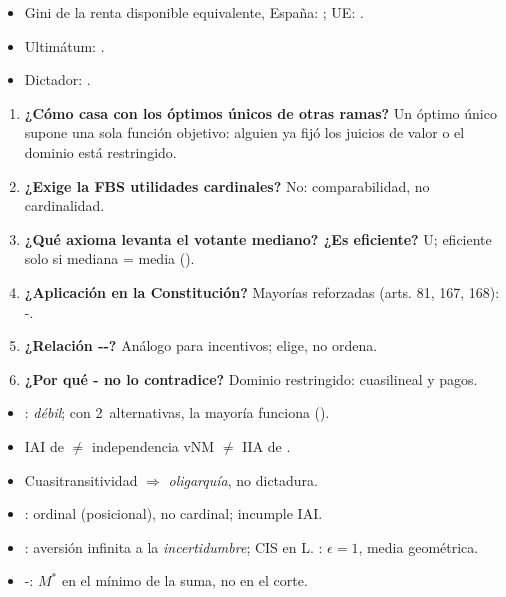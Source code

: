 \documentclass{article}
\begin{document}
\begin{columnas}
\anexorepaso
{}
\begin{itemize}
\item Gini de la renta disponible equivalente, España: ; UE: .
\item Ultimátum: .
\item Dictador: .
\end{itemize}
\begin{enumerate}
\item \textbf{¿Cómo casa  con los óptimos únicos de otras ramas?} Un óptimo único supone una sola función objetivo: alguien ya fijó los juicios de valor o el dominio está restringido.
\item \textbf{¿Exige la FBS utilidades cardinales?} No: comparabilidad, no cardinalidad.
\item \textbf{¿Qué axioma levanta el votante mediano? ¿Es eficiente?} U; eficiente solo si mediana = media ().
\item \textbf{¿Aplicación en la Constitución?} Mayorías reforzadas (arts. 81, 167, 168): -.
\item \textbf{¿Relación --?} Análogo para incentivos; elige, no ordena.
\item \textbf{¿Por qué - no lo contradice?} Dominio restringido: cuasilineal y pagos.
\end{enumerate}
\begin{trampa}
\begin{itemize}
\item {}:  \emph{débil}; con 2~alternativas, la mayoría funciona ().
\item IAI de  $\neq$ independencia vNM $\neq$ IIA de .
\item Cuasitransitividad $\Rightarrow$ \emph{oligarquía}, no dictadura.
\item {}: ordinal (posicional), no cardinal; incumple IAI.
\item {}: aversión infinita a la \emph{incertidumbre}; CIS en L. : $\epsilon=1$, media geométrica.
\item {}-: $M^*$ en el mínimo de la suma, no en el corte.
\end{itemize}
\end{trampa}

\end{columnas}
\end{document}
